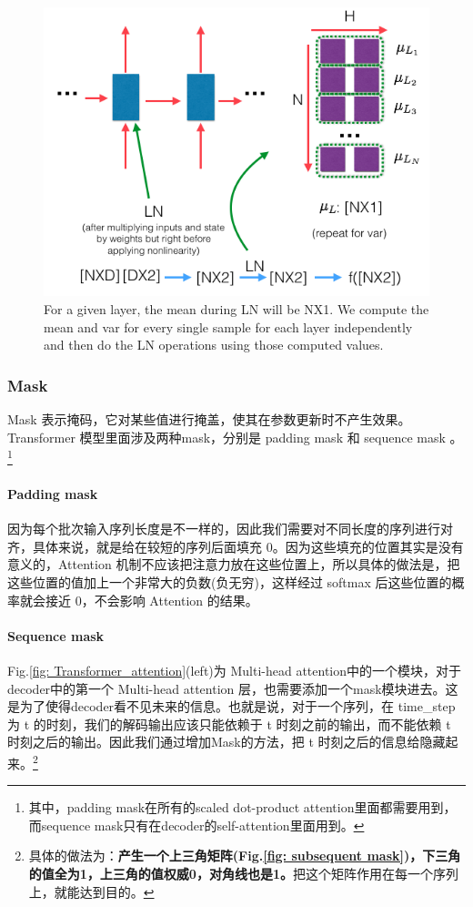 \documentclass[letterpaper,10pt]{article}
\begin{document}
	\begin{figure}[htbp]
		\centering 
		\includegraphics[width=0.6\columnwidth]{picture/layer_normalization}
		\captionsetup{font=scriptsize}
		\caption{
			\label{fig: Layer_normlization} For a given layer, the mean during LN will be NX1. We compute the mean and var for every single sample for each layer independently and then do the LN operations using those computed values.
		}
	\end{figure}
	
	\subsubsection{Mask}
	
	Mask 表示掩码，它对某些值进行掩盖，使其在参数更新时不产生效果。Transformer 模型里面涉及两种mask，分别是 padding mask 和 sequence mask 。\footnote{其中，padding mask在所有的scaled dot-product attention里面都需要用到，而sequence mask只有在decoder的self-attention里面用到。}
	
	\paragraph{Padding mask}
	
	因为每个批次输入序列长度是不一样的，因此我们需要对不同长度的序列进行对齐，具体来说，就是给在较短的序列后面填充 0。因为这些填充的位置其实是没有意义的，Attention 机制不应该把注意力放在这些位置上，所以具体的做法是，把这些位置的值加上一个非常大的负数(负无穷)，这样经过 softmax 后这些位置的概率就会接近 0，不会影响 Attention 的结果。
	
	\paragraph{Sequence mask}
	
	Fig.\ref{fig: Transformer_attention}(left)为 Multi-head attention中的一个模块，对于decoder中的第一个 Multi-head attention 层，也需要添加一个mask模块进去。这是为了使得decoder看不见未来的信息。也就是说，对于一个序列，在 time\_step 为 t 的时刻，我们的解码输出应该只能依赖于 t 时刻之前的输出，而不能依赖 t 时刻之后的输出。因此我们通过增加Mask的方法，把 t 时刻之后的信息给隐藏起来。\footnote{具体的做法为：\textbf{产生一个上三角矩阵(Fig.\ref{fig: subsequent mask})，下三角的值全为1，上三角的值权威0，对角线也是1。}把这个矩阵作用在每一个序列上，就能达到目的。}
	
\end{document}
